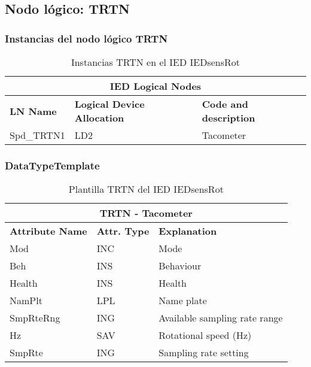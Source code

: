 
\subsection{Nodo l\'ogico: 			 TRTN}

    \subsubsection{Instancias del nodo l\'ogico TRTN}
    \begin{table}[H]
    \begin{center}
    \begin{tabular}{|l|l|p{6.8cm}|}
            \hline
            \multicolumn{3}{|c|}{\cellcolor[gray]{0.8} \textbf{IED Logical Nodes} } \\
            \hline
            \textbf{LN Name} & \textbf{Logical Device Allocation} & \textbf{Code and description} \\
            \hline
            Spd\_TRTN1 & LD2 & Tacometer \\
            \hline
    \end{tabular}
    \caption{Instancias TRTN en el IED IEDsensRot}
    \label{table:lnInstTRTN_1}
    \end{center}
    \end{table}
    
    
    
    \subsubsection{DataTypeTemplate}
    \begin{table}[H]
    \begin{center}
    \begin{tabular}{|l|l|p{8.5cm}|}
            \hline
            \multicolumn{3}{|c|}{\cellcolor[gray]{0.8} \textbf{ TRTN}  - Tacometer} \\
            \hline
            \textbf{Attribute Name} & \textbf{Attr. Type} & \textbf{Explanation} \\
            \hline 
            Mod & INC & Mode \\
            \hline
            Beh & INS & Behaviour \\
            \hline
            Health & INS & Health \\
            \hline
            NamPlt & LPL & Name plate \\
            \hline
            SmpRteRng & ING & Available sampling rate range \\
            \hline
            Hz & SAV & Rotational speed (Hz) \\
            \hline
            SmpRte & ING & Sampling rate setting \\
            \hline
    \end{tabular}
    \caption{Plantilla TRTN del IED IEDsensRot}
    \label{table:lnTypeTRTN_1}
    \end{center}
    \end{table}
    
    
    